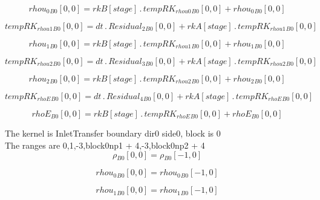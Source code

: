 \documentclass{article}
\begin{document}
\begin{dmath}{rhou_{0}{_{B0}}}[{0,0}] = {rkB}[{stage}] \,.\, {tempRK_{rhou0}{_{B0}}}[{0,0}] + {rhou_{0}{_{B0}}}[{0,0}]\end{dmath}

\begin{dmath}{tempRK_{rhou1}{_{B0}}}[{0,0}] = dt \,.\, {Residual_{2}{_{B0}}}[{0,0}] + {rkA}[{stage}] \,.\, {tempRK_{rhou1}{_{B0}}}[{0,0}]\end{dmath}

\begin{dmath}{rhou_{1}{_{B0}}}[{0,0}] = {rkB}[{stage}] \,.\, {tempRK_{rhou1}{_{B0}}}[{0,0}] + {rhou_{1}{_{B0}}}[{0,0}]\end{dmath}

\begin{dmath}{tempRK_{rhou2}{_{B0}}}[{0,0}] = dt \,.\, {Residual_{3}{_{B0}}}[{0,0}] + {rkA}[{stage}] \,.\, {tempRK_{rhou2}{_{B0}}}[{0,0}]\end{dmath}

\begin{dmath}{rhou_{2}{_{B0}}}[{0,0}] = {rkB}[{stage}] \,.\, {tempRK_{rhou2}{_{B0}}}[{0,0}] + {rhou_{2}{_{B0}}}[{0,0}]\end{dmath}

\begin{dmath}{tempRK_{rhoE}{_{B0}}}[{0,0}] = dt \,.\, {Residual_{4}{_{B0}}}[{0,0}] + {rkA}[{stage}] \,.\, {tempRK_{rhoE}{_{B0}}}[{0,0}]\end{dmath}

\begin{dmath}{rhoE{_{B0}}}[{0,0}] = {rkB}[{stage}] \,.\, {tempRK_{rhoE}{_{B0}}}[{0,0}] + {rhoE{_{B0}}}[{0,0}]\end{dmath}

\noindent The kernel is InletTransfer boundary dir0 side0, block is 0\\\noindent The ranges are 0,1,-3,block0np1 + 4,-3,block0np2 + 4\\\begin{dmath}{\rho{_{B0}}}[{0,0}] = {\rho{_{B0}}}[{-1,0}]\end{dmath}

\begin{dmath}{rhou_{0}{_{B0}}}[{0,0}] = {rhou_{0}{_{B0}}}[{-1,0}]\end{dmath}

\begin{dmath}{rhou_{1}{_{B0}}}[{0,0}] = {rhou_{1}{_{B0}}}[{-1,0}]\end{dmath}
\end{document}
